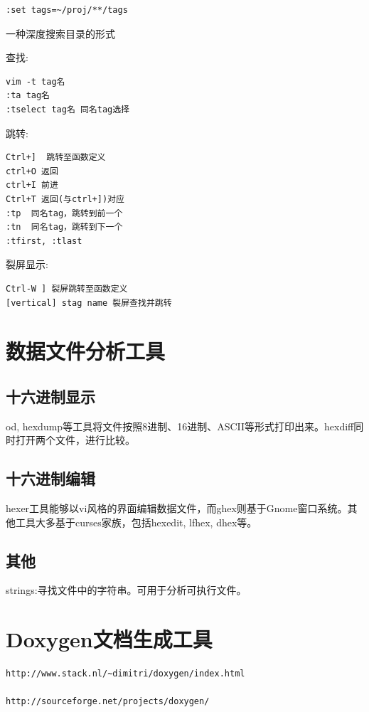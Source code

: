 \begin{verbatim}
:set tags=~/proj/**/tags
\end{verbatim}
一种深度搜索目录的形式

查找:
\begin{verbatim}
vim -t tag名
:ta tag名
:tselect tag名 同名tag选择

\end{verbatim}

跳转:
\begin{verbatim}
Ctrl+]  跳转至函数定义
ctrl+O 返回
ctrl+I 前进
Ctrl+T 返回(与ctrl+])对应
:tp  同名tag，跳转到前一个
:tn  同名tag，跳转到下一个
:tfirst, :tlast 
\end{verbatim}


裂屏显示:
\begin{verbatim}
Ctrl-W ] 裂屏跳转至函数定义
[vertical] stag name 裂屏查找并跳转
\end{verbatim}



\section{数据文件分析工具}

\subsection{十六进制显示}

od, hexdump等工具将文件按照8进制、16进制、ASCII等形式打印出来。hexdiff同时打开两个文件，进行比较。

\subsection{十六进制编辑}
hexer工具能够以vi风格的界面编辑数据文件，而ghex则基于Gnome窗口系统。其他工具大多基于curses家族，包括hexedit, lfhex, dhex等。

\subsection{其他}

strings:寻找文件中的字符串。可用于分析可执行文件。
\section{Doxygen文档生成工具}
\begin{verbatim}
http://www.stack.nl/~dimitri/doxygen/index.html

http://sourceforge.net/projects/doxygen/
\end{verbatim}

